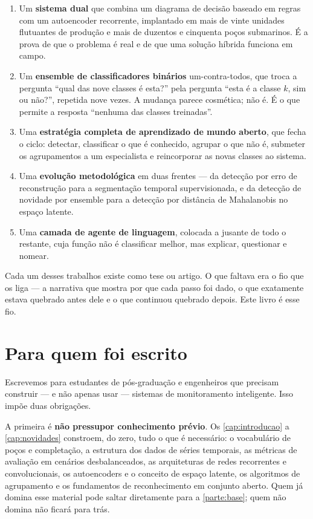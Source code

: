 \begin{enumerate}[leftmargin=*,itemsep=0.4em]
  \item Um \textbf{sistema dual} que combina um diagrama de decisão baseado em regras
        com um autoencoder recorrente, implantado em mais de vinte unidades flutuantes
        de produção e mais de duzentos e cinquenta poços submarinos. É a prova de que
        o problema é real e de que uma solução híbrida funciona em campo.
  \item Um \textbf{ensemble de classificadores binários} um-contra-todos, que troca a
        pergunta ``qual das nove classes é esta?'' pela pergunta ``esta é a classe
        $k$, sim ou não?'', repetida nove vezes. A mudança parece cosmética; não é.
        É o que permite a resposta ``nenhuma das classes treinadas''.
  \item Uma \textbf{estratégia completa de aprendizado de mundo aberto}, que fecha o
        ciclo: detectar, classificar o que é conhecido, agrupar o que não é, submeter
        os agrupamentos a um especialista e reincorporar as novas classes ao sistema.
  \item Uma \textbf{evolução metodológica} em duas frentes --- da detecção por erro de
        reconstrução para a segmentação temporal supervisionada, e da detecção de
        novidade por ensemble para a detecção por distância de Mahalanobis no espaço
        latente.
  \item Uma \textbf{camada de agente de linguagem}, colocada a jusante de todo o
        restante, cuja função não é classificar melhor, mas explicar, questionar e
        nomear.
\end{enumerate}

Cada um desses trabalhos existe como tese ou artigo. O que faltava era o fio que os
liga --- a narrativa que mostra por que cada passo foi dado, o que exatamente estava
quebrado antes dele e o que continuou quebrado depois. Este livro é esse fio.

\section*{Para quem foi escrito}

Escrevemos para estudantes de pós-graduação e engenheiros que precisam construir --- e
não apenas usar --- sistemas de monitoramento inteligente. Isso impõe duas obrigações.

A primeira é \textbf{não pressupor conhecimento prévio}. Os \cref{cap:introducao} a
\cref{cap:novidades} constroem, do zero, tudo o que é necessário: o vocabulário de
poços e completação, a estrutura dos dados de séries temporais, as métricas de
avaliação em cenários desbalanceados, as arquiteturas de redes recorrentes e
convolucionais, os autoencoders e o conceito de espaço latente, os algoritmos de
agrupamento e os fundamentos de reconhecimento em conjunto aberto. Quem já domina
esse material pode saltar diretamente para a \cref{parte:base}; quem não domina não
ficará para trás.

